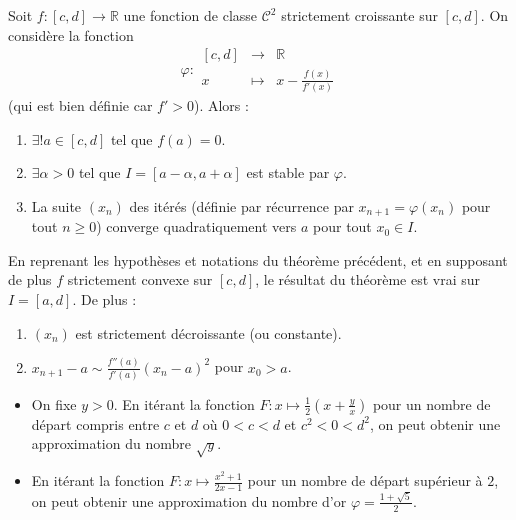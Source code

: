 	\begin{theorem}
		Soit $f : [c, d] \rightarrow \mathbb{R}$ une fonction de classe $\mathcal{C}^2$ strictement croissante sur $[c, d]$. On considère la fonction
		\[ \varphi :
		\begin{array}{ccc}
			[c, d] &\rightarrow& \mathbb{R} \\
			x &\mapsto& x - \frac{f(x)}{f'(x)}
		\end{array}
		\]
		(qui est bien définie car $f' > 0$). Alors :
		\begin{enumerate}[label=(\roman*)]
			\item $\exists! a \in [c, d]$ tel que $f(a) = 0$.
			\item $\exists \alpha > 0$ tel que $I = [a - \alpha, a + \alpha]$ est stable par $\varphi$.
			\item La suite $(x_n)$ des itérés (définie par récurrence par $x_{n+1} = \varphi(x_n)$ pour tout $n \geq 0$) converge quadratiquement vers $a$ pour tout $x_0 \in I$.
		\end{enumerate}
	\end{theorem}
	
	\begin{corollary}
		En reprenant les hypothèses et notations du théorème précédent, et en supposant de plus $f$ strictement convexe sur $[c, d]$, le résultat du théorème est vrai sur $I = [a, d]$. De plus :
		\begin{enumerate}[label=(\roman*)]
			\item $(x_n)$ est strictement décroissante (ou constante).
			\item $x_{n+1} - a \sim \frac{f''(a)}{f'(a)} (x_n - a)^2$ pour $x_0 > a$.
		\end{enumerate}
	\end{corollary}
	
	\begin{example}
		\begin{itemize}
			\item On fixe $y > 0$. En itérant la fonction $F : x \mapsto \frac{1}{2} \left( x + \frac{y}{x} \right)$ pour un nombre de départ compris entre $c$ et $d$ où $0 < c < d$ et $c^2 < 0 < d^2$, on peut obtenir une approximation du nombre $\sqrt{y}$.
			\item En itérant la fonction $F : x \mapsto \frac{x^2+1}{2x-1}$ pour un nombre de départ supérieur à $2$, on peut obtenir une approximation du nombre d'or $\varphi = \frac{1+\sqrt{5}}{2}$.
		\end{itemize}
	\end{example}
	
